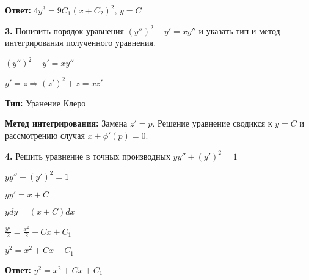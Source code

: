 \documentclass[a4paper]{article}
\begin{document}
\textbf{Ответ: } $\displaystyle 4y^3=9C_1(x+C_2)^2$, $\displaystyle y=C$

\vspace{1cm}

\textbf{3.} Понизить порядок уравнения $\displaystyle (y'')^2+y'=xy''$ и указать тип  и метод интегрирования полученного уравнения.

\vspace{0.3cm}

$\displaystyle (y'')^2+y'=xy''$

\vspace{0.3cm}

$\displaystyle y'=z \Rightarrow (z')^2+z=xz'$

\vspace{0.3cm}

\textbf{Тип: } Уранение Клеро

\textbf{Метод интегрирования: } Замена $\displaystyle z'=p$. Решение уравнение сводикся к $\displaystyle y=C$ и рассмотрению случая $\displaystyle x+\phi'(p)=0$.

\vspace{1cm}

\textbf{4.} Решить уравнение в точных производных $\displaystyle yy''+(y')^2=1$

\vspace{0.3cm}

$\displaystyle yy''+(y')^2=1$

\vspace{0.3cm}

$\displaystyle yy'=x+C$

\vspace{0.3cm}

$\displaystyle ydy=(x+C)dx$

\vspace{0.3cm}

$\displaystyle \frac{y^2}{2}=\frac{x^2}{2}+Cx+C_1$

\vspace{0.3cm}

$\displaystyle y^2=x^2+Cx+C_1$

\vspace{0.3cm}

\textbf{Ответ: } $\displaystyle y^2=x^2+Cx+C_1$
\end{document}
